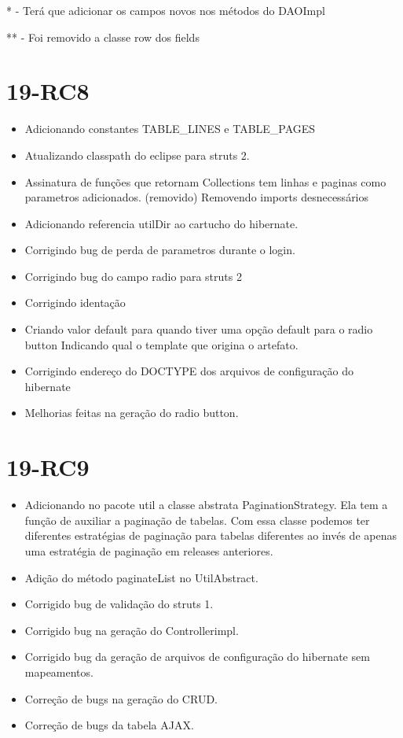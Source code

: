 * - Terá que adicionar os campos novos nos métodos do DAOImpl

** - Foi removido a classe row dos fields

\section{19-RC8}

\begin{itemize}
  \item Adicionando constantes TABLE\_LINES e TABLE\_PAGES
  \item Atualizando classpath do eclipse para struts 2.
  \item Assinatura de funções que retornam Collections tem linhas e paginas como
parametros adicionados. (removido) Removendo imports desnecessários
  \item Adicionando referencia utilDir ao cartucho do hibernate.
  \item Corrigindo bug de perda de parametros durante o login.
  \item Corrigindo bug do campo radio para struts 2
  \item Corrigindo identação
  \item Criando valor default para quando tiver uma opção default para o radio
button Indicando qual o template que origina o artefato.
  \item Corrigindo endereço do DOCTYPE dos arquivos de configuração do hibernate 
  \item Melhorias feitas na geração do radio button.
\end{itemize}

\section{19-RC9}

\begin{itemize}
  \item Adicionando no pacote util a classe abstrata PaginationStrategy. Ela tem
  a função de auxiliar a paginação de tabelas. Com essa classe podemos ter
  diferentes estratégias de paginação para tabelas diferentes ao invés de apenas
  uma estratégia de paginação em releases anteriores.
  \item Adição do método paginateList no UtilAbstract.
  \item Corrigido bug de validação do struts 1.
  \item Corrigido bug na geração do Controllerimpl. 
  \item Corrigido bug da geração de arquivos de configuração do hibernate sem
mapeamentos.
  \item Correção de bugs na geração do CRUD.
  \item Correção de bugs da tabela AJAX.
\end{itemize}

